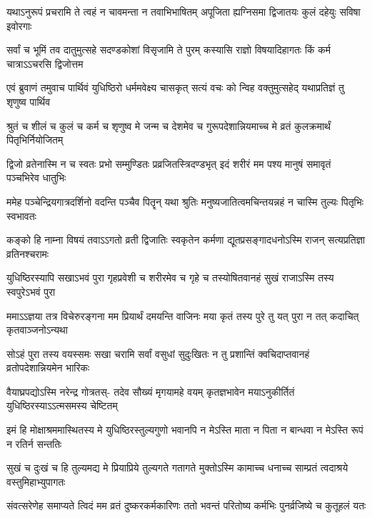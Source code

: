 \fourlineindentedshloka
{यथाऽनुरूपं प्रचरामि ते त्वहं}
{न चावमन्ता न तवाभिभाषितम्}
{अपूजिता ह्यग्निसमा द्विजातयः}
{कुलं दहेयुः सविषा इवोरगाः}


\fourlineindentedshloka
{सर्वां च भूमिं तव दातुमुत्सहे}
{सदण्डकोशां विसृजामि ते पुरम्}
{कस्यासि राज्ञो विषयादिहागतः}
{किं कर्म चात्राऽऽचरसि द्विजोत्तम}



\fourlineindentedshloka
{एवं ब्रुवाणं तमुवाच पार्थिवं}
{युधिष्ठिरो धर्ममवेक्ष्य चासकृत्}
{सत्यं वचः को न्विह वक्तुमुत्सहेद्}
{यथाप्रतिज्ञं तु शृणुष्व पार्थिव}


\fourlineindentedshloka
{श्रुतं च शीलं च कुलं च कर्म च}
{शृणुष्व मे जन्म च देशमेव च}
{गुरूपदेशान्नियमाच्च मे व्रतं}
{कुलक्रमार्थं पितृभिर्नियोजितम्}


\fourlineindentedshloka
{द्विजो व्रतेनास्मि न च स्वतः प्रभो}
{सम्मुण्डितः प्रव्रजितस्त्रिदण्डभृत्}
{इदं शरीरं मम पश्य मानुषं}
{समावृतं पञ्चभिरेव धातुभिः}


\fourlineindentedshloka
{ममेह पञ्चेन्द्रियगात्रदर्शिनो}
{वदन्ति पञ्चैव पितॄन् यथा श्रुतिः}
{मनुष्यजातित्वमचिन्तयन्नहं}
{न चास्मि तुल्यः पितृभिः स्वभावतः}


\fourlineindentedshloka
{कङ्को हि नाम्ना विषयं तवाऽऽगतो}
{व्रती द्विजातिः स्वकृतेन कर्मणा}
{द्यूतप्रसङ्गादधनोऽस्मि राजन्}
{सत्यप्रतिज्ञा व्रतिनश्चरामः}


\fourlineindentedshloka
{युधिष्ठिरस्यापि सखाऽभवं पुरा}
{गृहप्रवेशी च शरीरमेव च}
{गृहे च तस्योषितवानहं सुखं}
{राजाऽस्मि तस्य स्वपुरेऽभवं पुरा}


\fourlineindentedshloka
{ममाऽऽज्ञया तत्र विचेरुरङ्गना}
{मम प्रियार्थं दमयन्ति वाजिनः}
{मया कृतं तस्य पुरे तु यत् पुरा}
{न तत् कदाचित् कृतवाञ्जनोऽन्यथा}


\fourlineindentedshloka
{सोऽहं पुरा तस्य वयस्समः सखा}
{चरामि सर्वां वसुधां सुदुःखितः}
{न तु प्रशान्तिं क्वचिदाप्तवानहं}
{व्रतोपदेशान्नियमेन भारिकः}


\fourlineindentedshloka
{वैयाघ्रपद्योऽस्मि नरेन्द्र गोत्रतस्-}
{तदेव सौख्यं मृगयामहे वयम्}
{कृतज्ञभावेन मयाऽनुकीर्तितं}
{युधिष्ठिरस्याऽऽत्मसमस्य चेष्टितम्}


\fourlineindentedshloka
{इमं हि मोक्षाश्रममास्थितस्य मे}
{युधिष्ठिरस्तुल्यगुणो भवानपि}
{न मेऽस्ति माता न पिता न बान्धवा}
{न मेऽस्ति रूपं न रतिर्न सन्ततिः}


\fourlineindentedshloka
{सुखं च दुःखं च हि तुल्यमद्य मे}
{प्रियाप्रिये तुल्यगते गतागते}
{मुक्तोऽस्मि कामाच्च धनाच्च साम्प्रतं}
{त्वदाश्रये वस्तुमिहाभ्युपागतः}


\fourlineindentedshloka
{संवत्सरेणेह समाप्यते त्विदं}
{मम व्रतं दुष्करकर्मकारिणः}
{ततो भवन्तं परितोष्य कर्मभिः}
{पुनर्व्रजिष्ये च कुतूहलं यतः}


